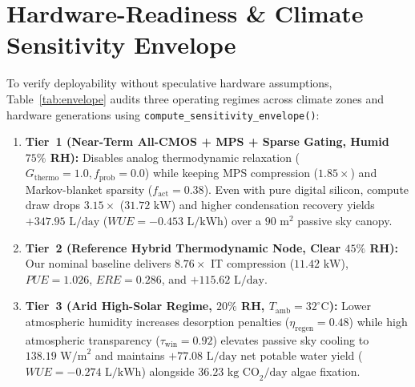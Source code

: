 \documentclass[10pt,twocolumn,a4paper]{article}
\begin{document}
\section{Hardware-Readiness \& Climate Sensitivity Envelope}
To verify deployability without speculative hardware assumptions, Table~\ref{tab:envelope} audits three operating regimes across climate zones and hardware generations using \texttt{compute\_sensitivity\_envelope()}:
\begin{enumerate}
\item \textbf{Tier~1 (Near-Term All-CMOS + MPS + Sparse Gating, Humid $75\%$ RH):} Disables analog thermodynamic relaxation ($G_{\mathrm{thermo}}=1.0, f_{\mathrm{prob}}=0.0$) while keeping MPS compression ($1.85\times$) and Markov-blanket sparsity ($f_{\mathrm{act}}=0.38$). Even with pure digital silicon, compute draw drops $3.15\times$ ($31.72\text{ kW}$) and higher condensation recovery yields $+347.95\text{ L/day}$ ($WUE = -0.453\text{ L/kWh}$) over a $90\text{ m}^2$ passive sky canopy.
\item \textbf{Tier~2 (Reference Hybrid Thermodynamic Node, Clear $45\%$ RH):} Our nominal baseline delivers $8.76\times$ IT compression ($11.42\text{ kW}$), $PUE = 1.026$, $ERE = 0.286$, and $+115.62\text{ L/day}$.
\item \textbf{Tier~3 (Arid High-Solar Regime, $20\%$ RH, $T_{\mathrm{amb}}=32^\circ\text{C}$):} Lower atmospheric humidity increases desorption penalties ($\eta_{\mathrm{regen}}=0.48$) while high atmospheric transparency ($\tau_{\mathrm{win}}=0.92$) elevates passive sky cooling to $138.19\text{ W/m}^2$ and maintains $+77.08\text{ L/day}$ net potable water yield ($WUE = -0.274\text{ L/kWh}$) alongside $36.23\text{ kg CO}_2/\text{day}$ algae fixation.
\end{enumerate}

\begin{table}[h]
\centering
\caption{Three-Tier Hardware \& Climate Sensitivity Envelope.}
\label{tab:envelope}
\end{table}
\end{document}
